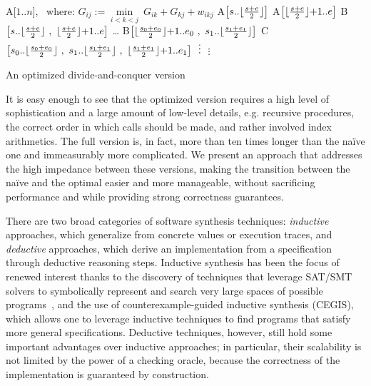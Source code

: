 \begin{algorithm}[b!]
\begin{algorithmic}
  \State A[$1..n$], ~where:
	      \State $G_{ij} := \underset{i<k<j}\min ~ G_{ik} + G_{kj} + w_{ikj}$
	    \EndFor
	  \EndFor
	\Else
	  \State A$\big[ s..\lfloor\frac{s+e}{2}\rfloor \big]$
	  \State A$\big[ \lfloor\frac{s+e}{2}\rfloor{+}1..e \big]$
	  \State B$\big[ s..\lfloor\frac{s+e}{2}\rfloor ~,~ \lfloor\frac{s+e}{2}\rfloor{+}1..e \big]$
	\EndIf
  \EndProcedure
	 \ldots
	\Else
	  \State B$\big[ \lfloor\frac{s_0+e_0}{2}\rfloor{+}1..e_0 ~,~ s_1..\lfloor\frac{s_1+e_1}{2}\rfloor \big]$
	  \State C$\big[ s_0..\lfloor\frac{s_0+e_0}{2}\rfloor ~,~ s_1..\lfloor\frac{s_1+e_1}{2}\rfloor ~,~ \lfloor\frac{s_1+e_1}{2}\rfloor{+}1..e_1 \big]$
	  \vspace{-5pt}
	  \State $\vdotswithin{C}$
	\EndIf
  \EndProcedure
    \vspace{-5pt}
    \State $\vdots$
  \EndProcedure
\end{algorithmic}
\caption{\label{intro:divide-and-conquer}
   An optimized divide-and-conquer version}
\end{algorithm}

It is easy enough to see that the optimized version requires a high level of
sophistication and a large amount of low-level details, e.g. recursive procedures,
the correct order in which calls should be made, and rather involved index
arithmetics. The full version is, in fact, more than ten times longer than the
na\"ive one and immeasurably more complicated. We present an approach that addresses
the high impedance between these versions, making the transition between the na\"ive
and the optimal easier and more manageable, without sacrificing performance and while
providing strong correctness guarantees.

There are two broad categories of software synthesis techniques: 
\emph{inductive} approaches, which generalize from concrete values or execution traces, and \emph{deductive} approaches, which derive an implementation from a specification through deductive reasoning steps. Inductive synthesis has been the focus of renewed interest thanks to the discovery of techniques that leverage SAT/SMT solvers to symbolically represent and search very large spaces of possible programs~\cite{APLAS09/Solar-Lezama, PLDI11/Gulwani, Onward13/Torlak}, and the use of counterexample-guided inductive synthesis (CEGIS), which allows one to leverage inductive techniques to find programs that satisfy more general specifications. Deductive techniques, however, still hold some important advantages over inductive approaches; in particular, their scalability is not limited by the power of a checking oracle, because the correctness of the implementation is guaranteed by construction.

